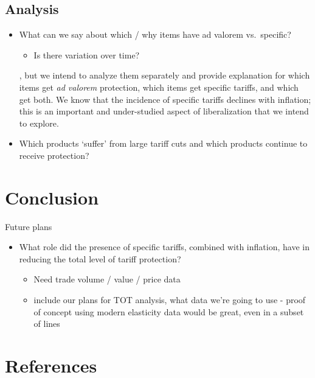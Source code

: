 \documentclass[
  12pt,
]{article}
\providecommand{\tightlist}{%
  \setlength{\itemsep}{0pt}\setlength{\parskip}{0pt}}
\begin{document}
\hypertarget{analysis}{%
\subsection{Analysis}\label{analysis}}

\begin{itemize}
\item
  What can we say about which / why items have ad valorem vs.~specific?

  \begin{itemize}
  \tightlist
  \item
    Is there variation over time?
  \end{itemize}

  , but we intend to analyze them separately and provide explanation for which items get \emph{ad valorem} protection, which items get specific tariffs, and which get both. We know that the incidence of specific tariffs declines with inflation; this is an important and under-studied aspect of liberalization that we intend to explore.
\item
  Which products `suffer' from large tariff cuts and which products continue to receive protection?
\end{itemize}

\hypertarget{conclusion}{%
\section{Conclusion}\label{conclusion}}

Future plans

\begin{itemize}
\item
  What role did the presence of specific tariffs, combined with inflation, have in reducing the total level of tariff protection?

  \begin{itemize}
  \item
    Need trade volume / value / price data
  \item
    include our plans for TOT analysis, what data we're going to use - proof of concept using modern elasticity data would be great, even in a subset of lines
  \end{itemize}
\end{itemize}

\hypertarget{references}{%
\section{References}\label{references}}
\end{document}
